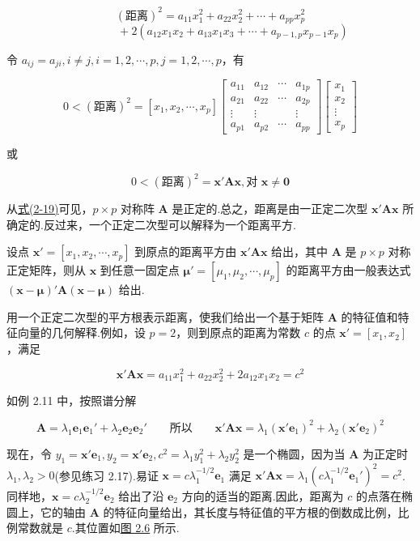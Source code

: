 
\[
(\text{距离})^2=a_{11}x_1^2+a_{22}x_2^2+\cdots+a_{pp}x_p^2
\]
\[
\hspace{4em}+2(a_{12}x_1x_2+a_{13}x_1x_3+\cdots+a_{p-1,p}x_{p-1}x_p)
\]

令 $a_{ij}=a_{ji},i\neq j,i=1,2,\cdots,p,j=1,2,\cdots,p$，有

\[
0<(\text{距离})^2=[x_1,x_2,\cdots,x_p]
\begin{bmatrix}
a_{11} & a_{12} & \cdots & a_{1p}\\
a_{21} & a_{22} & \cdots & a_{2p}\\
\vdots & \vdots & & \vdots\\
a_{p1} & a_{p2} & \cdots & a_{pp}
\end{bmatrix}
\begin{bmatrix}
x_1\\
x_2\\
\vdots\\
x_p
\end{bmatrix}
\]

或

\label{eq:2-19}
\begin{equation}
0<(\text{距离})^2=\bm{x}'\bm{A}\bm{x},\text{对 } \bm{x}\neq \bm{0} \tag{2-19}
\end{equation}

从\hyperref[eq:2-19]{式(2-19)}可见，$p\times p$ 对称阵 $\bm{A}$ 是正定的.总之，距离是由一正定二次型 $\bm{x}'\bm{A}\bm{x}$ 所确定的.反过来，一个正定二次型可以解释为一个距离平方.

 \quad 设点 $\bm{x}'=[x_1,x_2,\cdots,x_p]$ 到原点的距离平方由 $\bm{x}'\bm{A}\bm{x}$ 给出，其中 $\bm{A}$ 是 $p\times p$ 对称正定矩阵，则从 $\bm{x}$ 到任意一固定点 $\bm{\mu}'=[\mu_1,\mu_2,\cdots,\mu_p]$ 的距离平方由一般表达式 $(\bm{x}-\bm{\mu})'\bm{A}(\bm{x}-\bm{\mu})$ 给出.

用一个正定二次型的平方根表示距离，使我们给出一个基于矩阵 $\bm{A}$ 的特征值和特征向量的几何解释.例如，设 $p=2$，则到原点的距离为常数 $c$ 的点 $\bm{x}'=[x_1,x_2]$，满足

\[
\bm{x}'\bm{A}\bm{x}=a_{11}x_1^2+a_{22}x_2^2+2a_{12}x_1x_2=c^2
\]

如例 2.11 中，按照谱分解

\[
\bm{A}=\lambda_1\bm{e}_1\bm{e}_1'+\lambda_2\bm{e}_2\bm{e}_2' \qquad \text{所以} \qquad \bm{x}'\bm{A}\bm{x}=\lambda_1(\bm{x}'\bm{e}_1)^2+\lambda_2(\bm{x}'\bm{e}_2)^2
\]

现在，令 $y_1=\bm{x}'\bm{e}_1,y_2=\bm{x}'\bm{e}_2,c^2=\lambda_1y_1^2+\lambda_2y_2^2$ 是一个椭圆，因为当 $\bm{A}$ 为正定时 $\lambda_1,\lambda_2>0$(参见练习 2.17).易证 $\bm{x}=c\lambda_1^{-1/2}\bm{e}_1$ 满足 $\bm{x}'\bm{A}\bm{x}=\lambda_1(c\lambda_1^{-1/2}\bm{e}_1')^2=c^2$.同样地，$\bm{x}=c\lambda_2^{-1/2}\bm{e}_2$ 给出了沿 $\bm{e}_2$ 方向的适当的距离.因此，距离为 $c$ 的点落在椭圆上，它的轴由 $\bm{A}$ 的特征向量给出，其长度与特征值的平方根的倒数成比例，比例常数就是 $c$.其位置如\hyperref[fig:2.6]{图 2.6} 所示.

